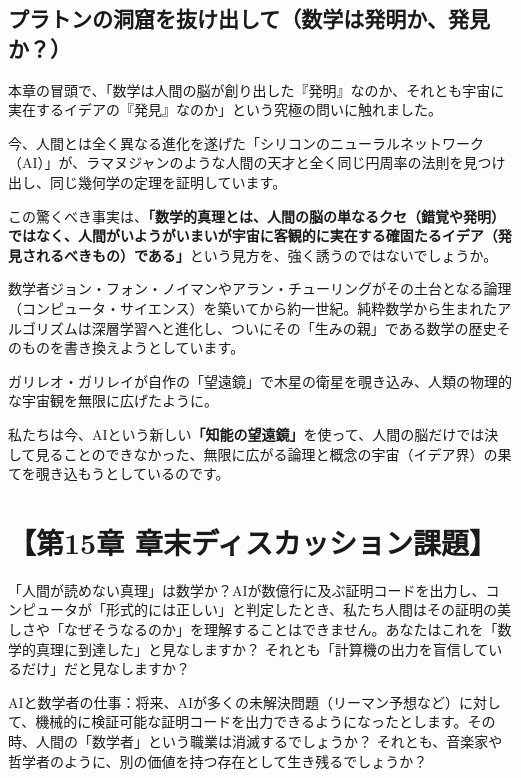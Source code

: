 \subsection{プラトンの洞窟を抜け出して（数学は発明か、発見か？）}

本章の冒頭で、「数学は人間の脳が創り出した『発明』なのか、それとも宇宙に実在するイデアの『発見』なのか」という究極の問いに触れました。

今、人間とは全く異なる進化を遂げた「シリコンのニューラルネットワーク（AI）」が、ラマヌジャンのような人間の天才と全く同じ円周率の法則を見つけ出し、同じ幾何学の定理を証明しています。

この驚くべき事実は、\textbf{「数学的真理とは、人間の脳の単なるクセ（錯覚や発明）ではなく、人間がいようがいまいが宇宙に客観的に実在する確固たるイデア（発見されるべきもの）である」}という見方を、強く誘うのではないでしょうか。

数学者ジョン・フォン・ノイマンやアラン・チューリングがその土台となる論理（コンピュータ・サイエンス）を築いてから約一世紀。純粋数学から生まれたアルゴリズムは深層学習へと進化し、ついにその「生みの親」である数学の歴史そのものを書き換えようとしています。

ガリレオ・ガリレイが自作の「望遠鏡」で木星の衛星を覗き込み、人類の物理的な宇宙観を無限に広げたように。

私たちは今、AIという新しい\textbf{「知能の望遠鏡」}を使って、人間の脳だけでは決して見ることのできなかった、無限に広がる論理と概念の宇宙（イデア界）の果てを覗き込もうとしているのです。

\section*{【第15章 章末ディスカッション課題】}

「人間が読めない真理」は数学か？AIが数億行に及ぶ証明コードを出力し、コンピュータが「形式的には正しい」と判定したとき、私たち人間はその証明の美しさや「なぜそうなるのか」を理解することはできません。あなたはこれを「数学的真理に到達した」と見なしますか？ それとも「計算機の出力を盲信しているだけ」だと見なしますか？

AIと数学者の仕事：将来、AIが多くの未解決問題（リーマン予想など）に対して、機械的に検証可能な証明コードを出力できるようになったとします。その時、人間の「数学者」という職業は消滅するでしょうか？ それとも、音楽家や哲学者のように、別の価値を持つ存在として生き残るでしょうか？




